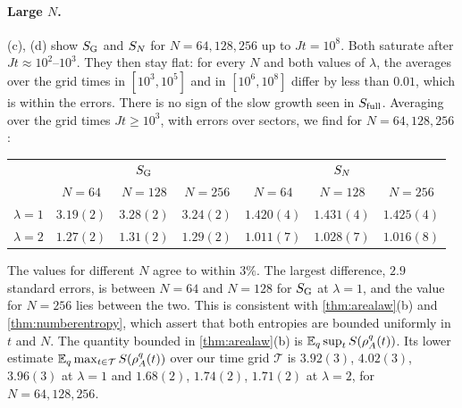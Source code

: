 \paragraph{Large $N$.}  (c), (d) show $S_{\mathrm{G}}$ and $S_{N}$ for $N=64,128,256$ up to $Jt=10^8$.  Both
saturate after $Jt\approx10^2$--$10^3$.  They then stay flat: for every $N$ and both values of $\lambda$, the averages over
the grid times in $[10^3,10^5]$ and in $[10^6,10^8]$ differ by less than $0.01$, which is within the errors.  There is
no sign of the slow growth seen in $S_{\mathrm{full}}$.  Averaging over the grid times $Jt\ge10^3$, with errors over sectors,
we find for $N=64,128,256$:
\begin{center}
\begin{tabular}{c|ccc|ccc}
 & \multicolumn{3}{c|}{$S_{\mathrm{G}}$} & \multicolumn{3}{c}{$S_{N}$}\\
 & $N=64$ & $N=128$ & $N=256$ & $N=64$ & $N=128$ & $N=256$\\\hline
$\lambda=1$ & $3.19(2)$ & $3.28(2)$ & $3.24(2)$ & $1.420(4)$ & $1.431(4)$ & $1.425(4)$\\
$\lambda=2$ & $1.27(2)$ & $1.31(2)$ & $1.29(2)$ & $1.011(7)$ & $1.028(7)$ & $1.016(8)$
\end{tabular}
\end{center}
The values for different $N$ agree to within $3\%$.  The largest difference, $2.9$ standard errors, is between $N=64$
and $N=128$ for $S_{\mathrm{G}}$ at $\lambda=1$, and the value for $N=256$ lies between the two.  This is consistent with
\cref{thm:arealaw}(b) and \cref{thm:numberentropy}, which assert that both entropies are bounded uniformly in $t$ and $N$.  The
quantity bounded in \cref{thm:arealaw}(b) is $\mathbb{E}_q\sup_tS(\rho^q_A(t))$.  Its lower estimate
$\mathbb{E}_q\max_{t\in\mathcal T}S(\rho^q_A(t))$ over our time grid $\mathcal T$ is $3.92(3)$, $4.02(3)$, $3.96(3)$ at
$\lambda=1$ and $1.68(2)$, $1.74(2)$, $1.71(2)$ at $\lambda=2$, for $N=64,128,256$.

